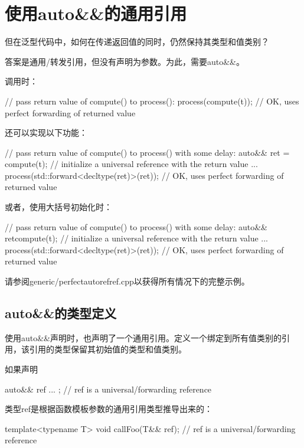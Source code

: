 \section{使用auto\&\&的通用引用}
但在泛型代码中，如何在传递返回值的同时，仍然保持其类型和值类别？

答案是通用/转发引用，但没有声明为参数。为此，需要auto\&\&。

调用时：

\begin{cppcode}
// pass return value of compute() to process():
process(compute(t)); // OK, uses perfect forwarding of returned value
\end{cppcode}

还可以实现以下功能：

\begin{cppcode}
// pass return value of compute() to process() with some delay:
auto&& ret = compute(t); // initialize a universal reference with the return value
...
process(std::forward<decltype(ret)>(ret)); // OK, uses perfect forwarding of returned value
\end{cppcode}

或者，使用大括号初始化时：

\begin{cppcode}
// pass return value of compute() to process() with some delay:
auto&& ret{compute(t)}; // initialize a universal reference with the return value
...
process(std::forward<decltype(ret)>(ret)); // OK, uses perfect forwarding of returned value
\end{cppcode}

请参阅generic/perfectautorefref.cpp以获得所有情况下的完整示例。

\subsection{auto\&\&的类型定义}

使用auto\&\&声明时，也声明了一个通用引用。定义一个绑定到所有值类别的引用，该引用的类型保留其初始值的类型和值类别。

如果声明

\begin{cppcode}
auto&& ref{ ... }; // ref is a universal/forwarding reference
\end{cppcode}

类型ref是根据函数模板参数的通用引用类型推导出来的：

\begin{cppcode}
template<typename T>
void callFoo(T&& ref); // ref is a universal/forwarding reference
\end{cppcode}

